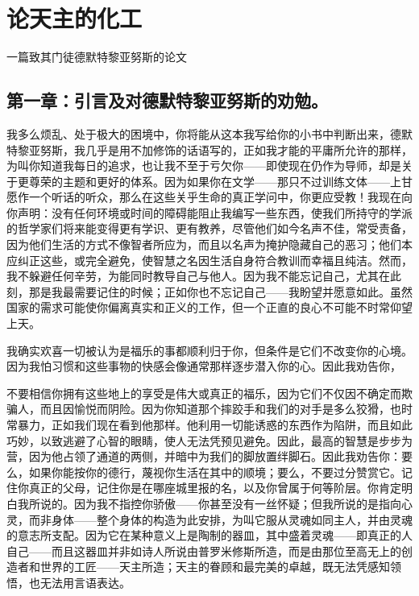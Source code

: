 
\chapter{论天主的化工}


一篇致其门徒德默特黎亚努斯的论文\par


\section{第一章：引言及对德默特黎亚努斯的劝勉。}

我多么烦乱、处于极大的困境中，你将能从这本我写给你的小书中判断出来，德默特黎亚努斯，我几乎是用不加修饰的话语写的，正如我才能的平庸所允许的那样，为叫你知道我每日的追求，也让我不至于亏欠你——即使现在仍作为导师，却是关于更尊荣的主题和更好的体系。因为如果你在文学——那只不过训练文体——上甘愿作一个听话的听众，那么在这些关乎生命的真正学问中，你更应受教！我现在向你声明：没有任何环境或时间的障碍能阻止我编写一些东西，使我们所持守的学派的哲学家们将来能变得更有学识、更有教养，尽管他们如今名声不佳，常受责备，因为他们生活的方式不像智者所应为，而且以名声为掩护隐藏自己的恶习；他们本应纠正这些，或完全避免，使智慧之名因生活自身符合教训而幸福且纯洁。然而，我不躲避任何辛劳，为能同时教导自己与他人。因为我不能忘记自己，尤其在此刻，那是我最需要记住的时候；正如你也不忘记自己——我盼望并愿意如此。虽然国家的需求可能使你偏离真实和正义的工作，但一个正直的良心不可能不时常仰望上天。\par

我确实欢喜一切被认为是福乐的事都顺利归于你，但条件是它们不改变你的心境。因为我怕习惯和这些事物的快感会像通常那样逐步潜入你的心。因此我劝告你，\par

\par

不要相信你拥有这些地上的享受是伟大或真正的福乐，因为它们不仅因不确定而欺骗人，而且因愉悦而阴险。因为你知道那个摔跤手和我们的对手是多么狡猾，也时常暴力，正如我们现在看到他那样。他利用一切能诱惑的东西作为陷阱，而且如此巧妙，以致逃避了心智的眼睛，使人无法凭预见避免。因此，最高的智慧是步步为营，因为他占领了通道的两侧，并暗中为我们的脚放置绊脚石。因此我劝告你：要么，如果你能按你的德行，蔑视你生活在其中的顺境；要么，不要过分赞赏它。记住你真正的父母，记住你是在哪座城里报的名，以及你曾属于何等阶层。你肯定明白我所说的。因为我不指控你骄傲——你甚至没有一丝怀疑；但我所说的是指向心灵，而非身体——整个身体的构造为此安排，为叫它服从灵魂如同主人，并由灵魂的意志所支配。因为它在某种意义上是陶制的器皿，其中盛着灵魂——即真正的人自己——而且这器皿并非如诗人所说由普罗米修斯所造，而是由那位至高无上的创造者和世界的工匠——天主所造；天主的眷顾和最完美的卓越，既无法凭感知领悟，也无法用言语表达。\par

